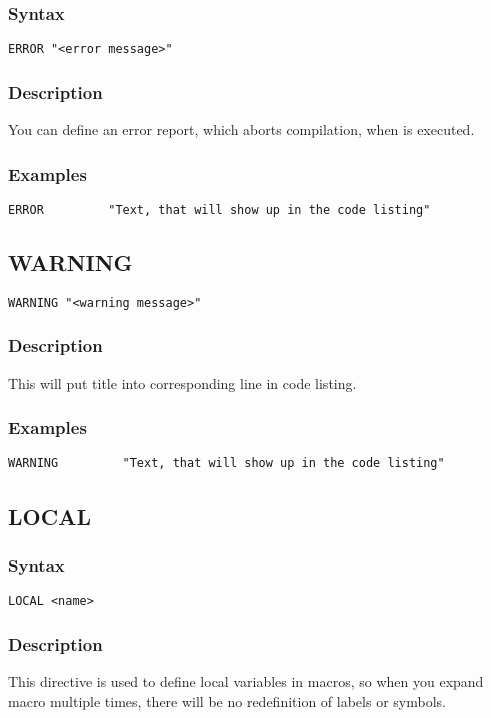         \subsubsection{Syntax}
            \verb'ERROR "<error message>"'

        \subsubsection{Description}
            You can define an error report, which aborts compilation, when is executed.

        \subsubsection{Examples}
            \verb'ERROR         "Text, that will show up in the code listing"'

    \subsection{WARNING}
            \verb'WARNING "<warning message>"'

        \subsubsection{Description}
            This will put title into corresponding line in code listing.

        \subsubsection{Examples}
            \verb'WARNING         "Text, that will show up in the code listing"'

    \subsection{LOCAL}
        \subsubsection{Syntax}
            \verb'LOCAL <name>'

        \subsubsection{Description}
            This directive is used to define local variables in macros, so when you expand macro multiple times, there will be no redefinition of labels or symbols.

